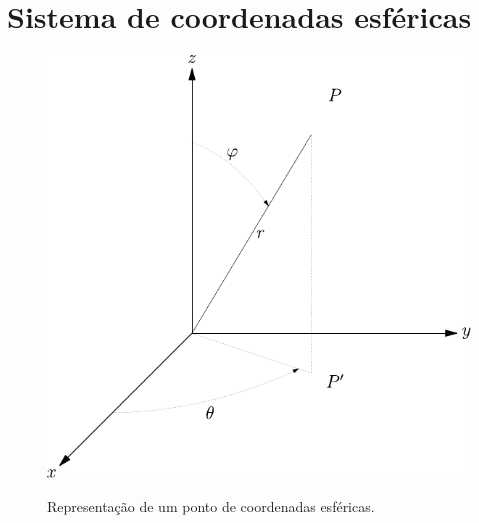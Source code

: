  \section{Sistema de coordenadas esféricas}
\begin{figure}%
\begin{center}
      \includegraphics{./cap_algvet/figs/coordenadas_esfericas}
   \caption{Representação de um ponto de coordenadas esféricas.}\label{./cap_algvet/figs/coo_esf}
      \label{fig:coordenadas_esfericas}
        \end{center}\end{figure}

